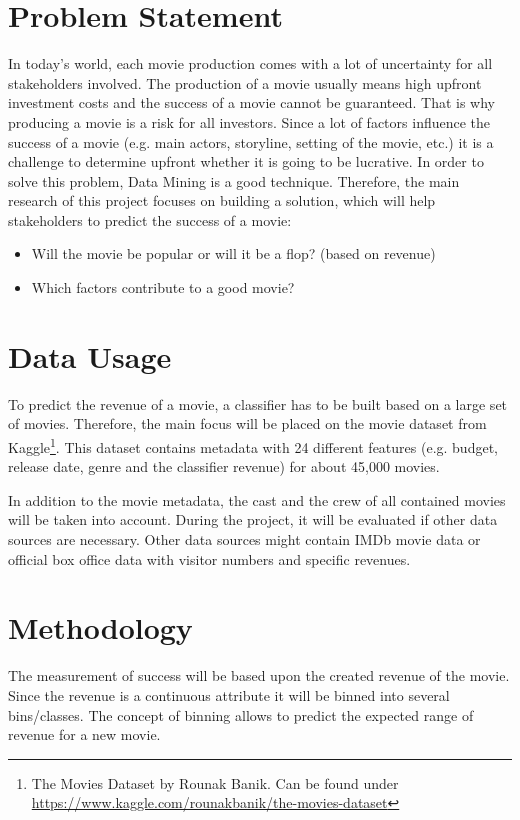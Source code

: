 

 
\section{Problem Statement}
In today's world, each movie production comes with a lot of uncertainty for all stakeholders involved. The production of a movie usually means high upfront investment costs and the success of a movie cannot be guaranteed. That is why producing a movie is a risk for all investors.
Since a lot of factors influence the success of a movie (e.g. main actors, storyline, setting of the movie, etc.) it is a challenge to determine upfront whether it is going to be lucrative.
In order to solve this problem, Data Mining is a good technique.
Therefore, the main research of this project focuses on building a solution, which will help stakeholders to predict the success of a movie:

\begin{itemize}
    \item Will the movie be popular or will it be a flop? (based on revenue)
    \item Which factors contribute to a good movie?
\end{itemize}


\section{Data Usage}
To predict the revenue of a movie, a classifier has to be built based on a large set of movies. Therefore, the main focus will be placed on the movie dataset from Kaggle\footnote{The Movies Dataset by Rounak Banik. Can be found under \url{https://www.kaggle.com/rounakbanik/the-movies-dataset}}. This dataset contains metadata with 24 different features (e.g. budget, release date, genre and the classifier revenue) for about 45,000 movies.

In addition to the movie metadata, the cast and the crew of all contained movies will be taken into account. During the project, it will be evaluated if other data sources are necessary. Other data sources might contain IMDb movie data or official box office data with visitor numbers and specific revenues.


\section{Methodology}

The measurement of success will be based upon the created revenue of the movie. Since the revenue is a continuous attribute it will be binned into several bins/classes. The concept of binning allows to predict the expected range of revenue for a new movie.

